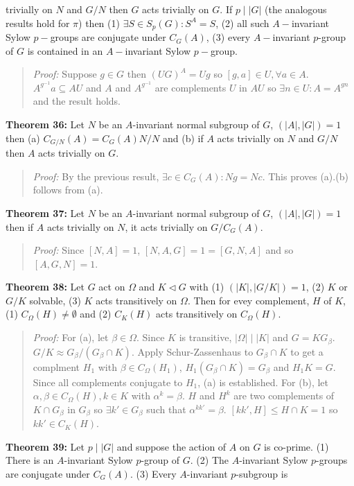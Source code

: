 trivially on $N$ and $G/N$ then $G$ acts trivially on $G$. If $p \mid |G|$ (the analogous
results hold for $\pi$) then (1) $\exists S \in S_p(G): S^A=S$, (2) all such $A-$invariant
Sylow $p-$groups are conjugate under $C_G(A)$, (3) every $A-$invariant $p$-group of
$G$ is contained in an $A-$invariant Sylow $p-$group. 
\begin{quote}
\emph{Proof:}  
Suppose $g \in G$ then $(UG)^A = Ug$ so $[g,a] \in U, \forall a \in A$.
$A^{g^{-1}}a \subseteq AU$ and $A$ and $A^{g^{-1}}$ are complements $U$ in $AU$
so $\exists n \in U: A= A^{gn}$ and the result holds.
\end{quote}
{\bf Theorem 36:}
Let $N$ be an $A$-invariant normal subgroup of $G$, $(|A|, |G|)=1$ then
(a) $C_{G/N}(A)= C_G(A)N/N$ and  (b) if $A$ acts trivially on $N$ and $G/N$ then
$A$ acts trivially on $G$.
\begin{quote}
\emph{Proof:}  
By the previous result, $\exists c \in C_G(A): Ng= Nc$.  This proves (a).(b) follows from (a).
\end{quote}
{\bf Theorem 37:}
Let $N$ be an $A$-invariant normal subgroup of $G$, $(|A|, |G|)=1$ then
if $A$ acts trivially on $N$, it acts trivially on $G/C_G(A)$.
\begin{quote}
\emph{Proof:}  
Since $[N,A]=1$, $[N,A,G]= 1= [G,N,A]$ and so $[A,G,N] = 1$.
\end{quote}
{\bf Theorem 38:}
Let $G$ act on $\Omega$ and $K \lhd G$ with (1) $(|K|, |G/K|)=1$, (2) $K$ or $G/K$ solvable,
(3) $K$ acts transitively on $\Omega$.  Then for evey complement, $H$ of $K$, (1) $C_{\Omega}(H) \ne \emptyset$ and
(2) $C_K(H)$ acts transitively on $C_{\Omega}(H)$.
\begin{quote}
\emph{Proof:}  
For (a), let $\beta \in \Omega$.  Since $K$ is transitive, $|\Omega| \mid |K|$ and $G= K G_{\beta}$.
$G/K \approx G_{\beta}/(G_{\beta} \cap K)$.  Apply Schur-Zassenhaus to $G_{\beta} \cap K$ to get a complment
$H_1$ with $\beta \in C_{\Omega}(H_1)$, $H_1(G_{\beta} \cap K)= G_{\beta}$ and $H_1K=G$.  Since all complements
conjugate to $H_1$, (a) is established.  For (b), let $\alpha, \beta \in C_{\Omega}(H), k \in K$ with
$\alpha^k= \beta$.  $H$ and $H^k$ are two complements of $K \cap G_{\beta}$ in $G_{\beta}$ so
$\exists k' \in G_{\beta}$ such that $\alpha^{k k'}= \beta$.  $[k k', H] \leq H \cap K =1$ so
$k k' \in C_K(H)$.
\end{quote}
{\bf Theorem 39:}
Let $p \mid |G|$ and suppose the action of $A$ on $G$ is co-prime.  (1) There is an $A$-invariant Sylow $p$-group of
$G$. (2) The $A$-invariant Sylow $p$-groups are conjugate under $C_G(A)$.  (3) Every $A$-invariant $p$-subgroup is
